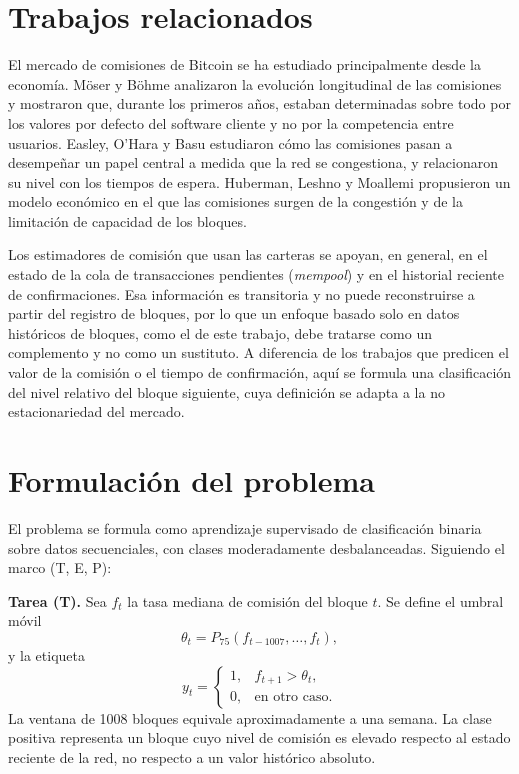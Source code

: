\documentclass[conference]{IEEEtran}
\begin{document}
\section{Trabajos relacionados}
El mercado de comisiones de Bitcoin se ha estudiado principalmente desde la economía. Möser y Böhme \cite{moser2015} analizaron la evolución longitudinal de las comisiones y mostraron que, durante los primeros años, estaban determinadas sobre todo por los valores por defecto del software cliente y no por la competencia entre usuarios. Easley, O'Hara y Basu \cite{easley2019} estudiaron cómo las comisiones pasan a desempeñar un papel central a medida que la red se congestiona, y relacionaron su nivel con los tiempos de espera. Huberman, Leshno y Moallemi \cite{huberman2021} propusieron un modelo económico en el que las comisiones surgen de la congestión y de la limitación de capacidad de los bloques.

Los estimadores de comisión que usan las carteras se apoyan, en general, en el estado de la cola de transacciones pendientes (\textit{mempool}) y en el historial reciente de confirmaciones. Esa información es transitoria y no puede reconstruirse a partir del registro de bloques, por lo que un enfoque basado solo en datos históricos de bloques, como el de este trabajo, debe tratarse como un complemento y no como un sustituto. A diferencia de los trabajos que predicen el valor de la comisión o el tiempo de confirmación, aquí se formula una clasificación del nivel relativo del bloque siguiente, cuya definición se adapta a la no estacionariedad del mercado.

\section{Formulación del problema}
El problema se formula como aprendizaje supervisado de clasificación binaria sobre datos secuenciales, con clases moderadamente desbalanceadas. Siguiendo el marco (T, E, P):

\textbf{Tarea (T).} Sea $f_t$ la tasa mediana de comisión del bloque $t$. Se define el umbral móvil
\begin{equation}
\theta_t = P_{75}(f_{t-1007},\dots,f_t),
\end{equation}
y la etiqueta
\begin{equation}
y_t = \begin{cases} 1, & f_{t+1} > \theta_t,\\ 0, & \text{en otro caso.}\end{cases}
\end{equation}
La ventana de 1008 bloques equivale aproximadamente a una semana. La clase positiva representa un bloque cuyo nivel de comisión es elevado respecto al estado reciente de la red, no respecto a un valor histórico absoluto.
\end{document}

